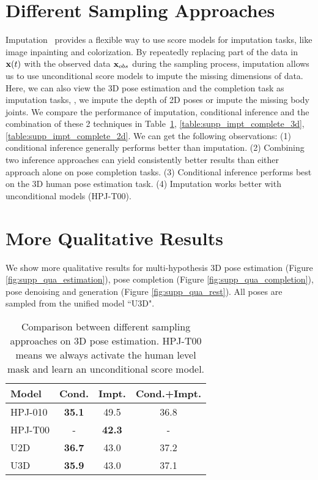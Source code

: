 \documentclass[10pt,twocolumn,letterpaper]{article}
\begin{document}
\section{Different Sampling Approaches}
\label{sec:supp_imputation}
Imputation~\cite{song2020score} provides a flexible way to use score models for imputation tasks, like image inpainting and colorization. By repeatedly replacing part of the data in $\mathbf{x}(t)$ with the observed data $\mathbf{x}_{obs}$ during the sampling process, imputation allows us to use unconditional score models to impute the missing dimensions of data. Here, we can also view the 3D pose estimation and the completion task as imputation tasks, \ie, we impute the depth of 2D poses or impute the missing body joints. We compare the performance of imputation, conditional inference and the combination of these 2 techniques in Table~\ref{table:supp_impt_hpe3d}, \ref{table:supp_impt_complete_3d}, \ref{table:supp_impt_complete_2d}. We can get the following observations: (1) conditional inference generally performs better than imputation. (2) Combining two inference approaches can yield consistently better results than either approach alone on pose completion tasks. (3) Conditional inference performs best on the 3D human pose estimation task. (4) Imputation works better with unconditional models (HPJ-T00).

\section{More Qualitative Results}
We show more qualitative results for multi-hypothesis 3D pose estimation (Figure \ref{fig:supp_qua_estimation}), pose completion (Figure \ref{fig:supp_qua_completion}), pose denoising and generation (Figure \ref{fig:supp_qua_rest}). All poses are sampled from the unified  model ``U3D". 







\begin{table}
    \centering
    \small
\begin{tabular}{l c c c}
            \toprule
            Model & Cond. & Impt. & Cond.+Impt. \\
            \midrule
            HPJ-010 &  \textbf{35.1} & 49.5 & 36.8 \\
            HPJ-T00 &  - & \textbf{42.3} & - \\
            U2D &  \textbf{36.7} & 43.0 & 37.2 \\
            U3D &  \textbf{35.9} & 43.0 & 37.1\\
            \bottomrule
        \end{tabular}
\caption{Comparison between different sampling approaches on 3D pose estimation. HPJ-T00 means we always activate the human level mask and learn an unconditional score model.}
    \label{table:supp_impt_hpe3d}
\end{table}
\end{document}
